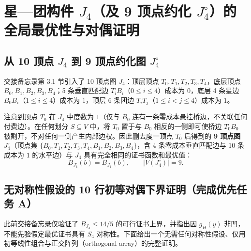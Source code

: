 \documentclass[11pt,a4paper]{ctexart}
\theoremstyle{definition}
\newcommand{\1}{\boldsymbol 1}
\newcommand{\0}{\boldsymbol 0}
\begin{document}
\section{星—团构件 $J_4$（及 9 顶点约化 $J_4^\circ$）的全局最优性与对偶证明}

\subsection{从 10 顶点 $J_4$ 到 9 顶点约化图 $J_4^\circ$}
交接备忘录第 3.1 节引入了 10 顶点图 $J_4$：顶层顶点 $T_0,T_1,T_2,T_3,T_4$，底层顶点 $B_0,B_1,B_2,B_3,B_4$；5 条垂直匹配边 $T_iB_i$（$0\le i\le 4$）成本为 $0$，底层 4 条星边 $B_0B_i$（$1\le i\le 4$）成本为 $1$，顶层 6 条团边 $T_iT_j$（$1\le i<j\le 4$）成本为 $1$。

注意到顶点 $T_0$ 在 $J_4$ 中度数为 $1$（仅与 $B_0$ 连有一条零成本悬挂桥边，不关联任何付费边）。在任何划分 $S\subseteq V$ 中，将 $T_0$ 置于与 $B_0$ 相反的一侧即可使桥边 $T_0B_0$ 被割开，不对任何一侧产生内部边权。因此删去度一顶点 $T_0$ 后得到的 \textbf{9 顶点图 $J_4^\circ$}（顶点集 $\{B_0,T_1,T_2,T_3,T_4,B_1,B_2,B_3,B_4\}$，含 4 条零成本垂直匹配边与 10 条成本为 $1$ 的水平边）与 $J_4$ 具有完全相同的证书函数和最优值：
\begin{equation}\label{eq:J4_9v}
 B_{J_4^\circ}(b)=B_{J_4}(b),\qquad |V(J_4^\circ)|=9.
\end{equation}

\subsection{无对称性假设的 10 行初等对偶下界证明（完成优先任务 A）}
此前交接备忘录仅验证了 $B_{J_4}\le 14/5$ 的可行证书上界，并指出因 $g_H(y)$ 非凹，不能先验假定最优证书具有 $S_4$ 对称性。下面给出一个无需任何对称性假设、仅用初等线性组合与正交阵列（orthogonal array）的完整证明。
\end{document}
